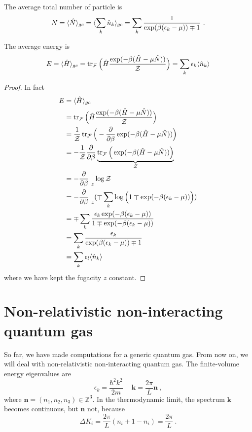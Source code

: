     The average total number of particle is 
    \begin{equation*}
        N = \langle\hat N\rangle_{gc} = \langle\sum_k \hat n_k\rangle_{gc} = \sum_k \frac{1}{\exp(\beta(\epsilon_k - \mu))\mp 1} ~.
    \end{equation*}

    The average energy is 
    \begin{equation*}
        E = \langle\hat H\rangle_{gc} = \operatorname{tr}_{\mathcal F} \Big (\hat H \frac{\exp (-\beta (\hat H - \mu \hat N))}{\mathcal Z} \Big) = \sum_k \epsilon_k \langle\hat n_k\rangle
    \end{equation*}
    \begin{proof}
        In fact 
        \begin{equation*}
        \begin{aligned}
            E & = \langle\hat H\rangle_{gc} \\ & = \operatorname{tr}_{\mathcal F} \Big (\hat H \frac{\exp (-\beta (\hat H - \mu \hat N))}{\mathcal Z} \Big) \\ & = \frac{1}{\mathcal Z} \operatorname{tr}_{\mathcal F} \Big (- \frac{\partial}{\partial\beta} \exp (-\beta (\hat H - \mu \hat N)) \Big) \\ & = - \frac{1}{\mathcal Z} \frac{\partial}{\partial\beta}\underbrace{ \operatorname{tr}_{\mathcal F} \Big (\exp (-\beta (\hat H - \mu \hat N)) \Big)}_{\mathcal Z} \\ & = - \frac{\partial}{\partial\beta} \Big \vert_z \log \mathcal Z \\ & =  - \frac{\partial}{\partial\beta} \Big \vert_z (\mp \sum_k \log \Big (1 \mp \exp (-\beta (\epsilon_k - \mu)) \Big)) \\ & = \mp \sum_k \frac{\epsilon_k \exp (-\beta (\epsilon_k - \mu))}{1 \mp \exp (-\beta (\epsilon_k - \mu))} \\ & = \sum_k \frac{\epsilon_k}{\exp (\beta (\epsilon_k - \mu)) \mp 1} \\ & = \sum_k \epsilon_l \langle\hat n_k\rangle
        \end{aligned}
        \end{equation*}
        where we have kept the fugacity $z$ constant.
    \end{proof}

\section{Non-relativistic non-interacting quantum gas}

    So far, we have made computations for a generic quantum gas. From now on, we will deal with non-relativistic non-interacting quantum gas. The finite-volume energy eigenvalues are 
    \begin{equation*}
        \epsilon_k = \frac{\hbar^2 k^2}{2m} ~ \quad \mathbf k = \frac{2\pi}{L} \mathbf n ~,
    \end{equation*}
    where $\mathbf n = (n_1, n_2, n_3) \in \mathbb Z^3$. In the thermodynamic limit, the spectrum $\mathbf k$ becomes continuous, but $\mathbf n$ not, because
    \begin{equation*}
        \Delta K_i = \frac{2\pi}{L} (n_i + 1 - n_i) = \frac{2\pi}{L} ~.
    \end{equation*}

